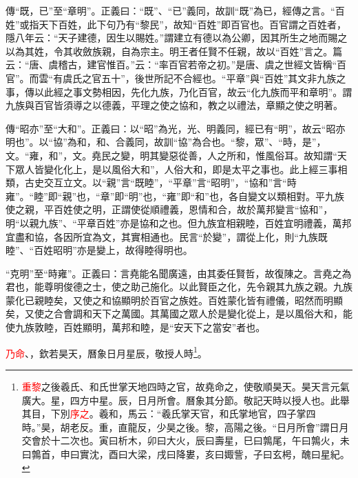 {\noindent\zhuan{}\fzbyks 傳“既，已”至“章明”。正義曰：“既”、“已”義同，故訓“既”為已，經傳之言。“百姓”或指天下百姓，此下句乃有“黎民”，故知“百姓”即百官也。百官謂之百姓者，隱八年云：“天子建德，因生以賜姓。”謂建立有德以為公卿，因其所生之地而賜之以為其姓，令其收斂族親，自為宗主。明王者任賢不任親，故以“百姓”言之。篇云：“唐、虞稽古，建官惟百。”云：“率百官若帝之初。”是唐、虞之世經文皆稱“百官”。而雲“有虞氏之官五十”，後世所記不合經也。“平章”與“百姓”其文非九族之事，傳以此經之事文勢相因，先化九族，乃化百官，故云“化九族而平和章明”。謂九族與百官皆須導之以德義，平理之使之協和，教之以禮法，章顯之使之明著。 \par}

{\noindent\zhuan{}\fzbyks 傳“昭亦”至“大和”。正義曰：以“昭”為光，光、明義同，經已有“明”，故云“昭亦明也”。以“協”為和，和、合義同，故訓“協”為合也。“黎，眾”、“時，是”，文。“雍，和”，文。堯民之變，明其變惡從善，人之所和，惟風俗耳。故知謂“天下眾人皆變化化上，是以風俗大和”，人俗大和，即是太平之事也。此上經三事相類，古史交互立文。以“親”言“既睦”，“平章”言“昭明”，“協和”言“時雍”。“睦”即“親”也，“章”即“明”也，“雍”即“和”也，各自變文以類相對。平九族使之親，平百姓使之明，正謂使從順禮義，恩情和合，故於萬邦變言“協和”，明“以親九族”、“平章百姓”亦是協和之也。但九族宜相親睦，百姓宜明禮義，萬邦宜盡和協，各因所宜為文，其實相通也。民言“於變”，謂從上化，則“九族既睦”、“百姓昭明”亦是變上，故得睦得明也。 \par}

{\noindent\shu{}\fzkt “克明”至“時雍”。正義曰：言堯能名聞廣遠，由其委任賢哲，故復陳之。言堯之為君也，能尊明俊德之士，使之助己施化。以此賢臣之化，先令親其九族之親。九族蒙化已親睦矣，又使之和協顯明於百官之族姓。百姓蒙化皆有禮儀，昭然而明顯矣，又使之合會調和天下之萬國。其萬國之眾人於是變化從上，是以風俗大和，能使九族敦睦，百姓顯明，萬邦和睦，是“安天下之當安”者也。 \par}

\textcolor{red}{乃命}、，欽若昊天，曆象日月星辰，敬授人時\footnote{\textcolor{red}{重黎}之後羲氏、和氏世掌天地四時之官，故堯命之，使敬順昊天。昊天言元氣廣大。星，四方中星。辰，日月所會。曆象其分節。敬記天時以授人也。此舉其目，下別\textcolor{red}{序之}。羲和，馬云：“羲氏掌天官，和氏掌地官，四子掌四時。”昊，胡老反。重，直龍反，少昊之後。黎，高陽之後。“日月所會”謂日月交會於十二次也。寅曰析木，卯曰大火，辰曰壽星，巳曰鶉尾，午曰鶉火，未曰鶉首，申曰實沈，酉曰大梁，戌曰降婁，亥曰娵訾，子曰玄枵，醜曰星紀。}。


